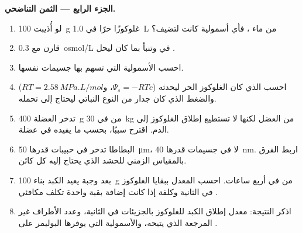 \begin{problem}
\medskip
\noindent\textbf{الجزء الرابع --- الثمن التناضحي.}
\begin{enumerate}[resume]
  \item لو أُذيبت \qty{100}{g} غلوكوزًا حرًا في \qty{1.0}{L} من ماء
        ، فأي أسمولية كانت لتضيف؟
  \item قارن مع \qty{0.3}{osmol/L} في  وتنبأ بما كان
        ليحل .
  \item احسب الأسمولية التي تسهم بها جسيمات  نفسها.
  \item احسب  الذي كان الغلوكوز الحر ليحدثه
        ($\Psi_s = -RTc$، و$RT = \qty{2.58}{MPa.L/mol}$) والضغط الذي
        كان جدار من النوع النباتي ليحتاج إلى تحمله.
  \item تدخر العضلة \qty{400}{g} من  في \qty{30}{kg} من
        العضل لكنها لا تستطيع إطلاق الغلوكوز إلى الدم. اقترح سببًا،
        بحسب ما يفيده  في عضلة.
  \item البطاطا تدخر  في حبيبات قدرها \qty{50}{\micro m}، لا في
        جسيمات  قدرها \qty{40}{nm}. اربط الفرق بالمقياس
        الزمني للحشد الذي يحتاج إليه كل كائن.
  \item بعد وجبة يعيد الكبد بناء \qty{100}{g} من  في أربع
        ساعات. احسب المعدل ببقايا الغلوكوز في الثانية وكلفة  إذا
        كانت إضافة بقية واحدة تكلف مكافئي .
  \item اذكر النتيجة: معدل إطلاق الكبد للغلوكوز بالجزيئات في الثانية،
        وعدد الأطراف غير المرجعة الذي يتيحه، والأسمولية التي يوفرها
        البوليمر على .
\end{enumerate}
\end{problem}
